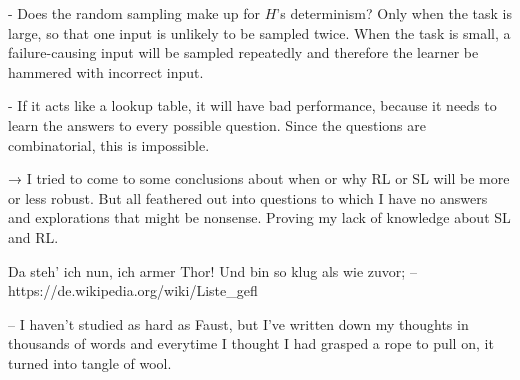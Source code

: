 \documentclass{farlamp}
\begin{document}
- Does the random sampling make up for $H$'s determinism? Only when the task is
large, so that one input is unlikely to be sampled twice. When the task is
small, a failure-causing input will be sampled repeatedly and therefore the
learner be hammered with incorrect input.

- If it acts like a lookup table, it will have bad performance, because it needs
to learn the answers to every possible question. Since the questions are
combinatorial, this is impossible.

→ I tried to come to some conclusions about when or why RL or SL will be more or
less robust. But all feathered out into questions to which I have no answers and
explorations that might be nonsense. Proving my lack of knowledge about SL and
RL.

Da steh’ ich nun, ich armer Thor!
Und bin so klug als wie zuvor;
-- https://de.wikipedia.org/wiki/Liste_gefl%

– I haven't studied as hard as Faust, but I've written down my thoughts in
thousands of words and everytime I thought I had grasped a rope to pull on, it
turned into tangle of wool.

\printbibliography
\end{document}

